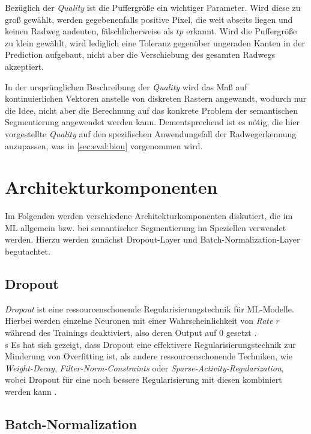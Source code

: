 Bezüglich der \textit{Quality} ist die Puffergröße ein wichtiger Parameter.
Wird diese zu groß gewählt, werden gegebenenfalls positive Pixel, die weit abseits liegen und keinen Radweg andeuten, fälschlicherweise 
als $tp$ erkannt. Wird die Puffergröße zu klein gewählt, wird lediglich eine Toleranz gegenüber ungeraden 
Kanten in der Prediction aufgebaut, nicht aber die Verschiebung des gesamten Radwegs akzeptiert.

In der ursprünglichen Beschreibung der \textit{Quality} wird das Maß auf kontinuierlichen Vektoren anstelle von diskreten Rastern angewandt, wodurch nur die 
Idee, nicht aber die Berechnung auf das konkrete Problem der semantischen Segmentierung angewendet werden kann. Dementsprechend ist es nötig, 
die hier vorgestellte \textit{Quality} auf den spezifischen Anwendungsfall der Radwegerkennung anzupassen, 
was in \autoref{sec:eval:biou} vorgenommen wird. 

\section{Architekturkomponenten}

Im Folgenden werden verschiedene Architekturkomponenten diskutiert, die im \ac{ML} allgemein 
bzw. bei semantischer Segmentierung im Speziellen verwendet werden. Hierzu werden zunächst Dropout-Layer 
und Batch-Normalization-Layer begutachtet. 

\subsection{Dropout} \label{sec:architekturkomponenten:dropout}

\textit{Dropout} ist eine ressourcenschonende Regularisierungstechnik für \ac{ML}-Modelle. 
Hierbei werden einzelne Neuronen mit einer Wahrscheinlichkeit von \textit{Rate} $r$ während des Trainings 
deaktiviert, also deren Output auf $0$ gesetzt \cites{Goodfellow.2016}{NitishSrivastava.2014}. \\s
Es hat sich gezeigt, dass Dropout eine effektivere Regularisierungstechnik zur Minderung von Overfitting ist, 
als andere ressourcenschonende Techniken, wie \textit{Weight-Decay}, \textit{Filter-Norm-Constraints} oder 
\textit{Sparse-Activity-Regularization}, wobei Dropout für eine noch bessere Regularisierung mit diesen kombiniert werden kann \cites{Goodfellow.2016}.

\subsection{Batch-Normalization} \label{sec:architekturkomponenten:batchnorm}

